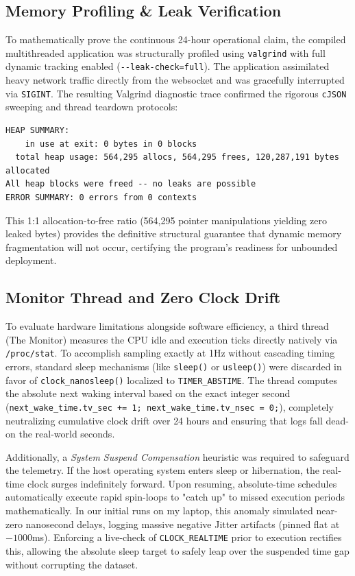 \documentclass[12pt,a4paper]{article}
\begin{document}
\subsection{Memory Profiling \& Leak Verification}
To mathematically prove the continuous 24-hour operational claim, the compiled multithreaded application was structurally profiled using \texttt{valgrind} with full dynamic tracking enabled (\texttt{-{}-leak-check=full}).
The application assimilated heavy network traffic directly from the websocket and was gracefully interrupted via \texttt{SIGINT}. The resulting Valgrind diagnostic trace confirmed the rigorous \texttt{cJSON} sweeping and thread teardown protocols:
\begin{verbatim}
HEAP SUMMARY:
    in use at exit: 0 bytes in 0 blocks
  total heap usage: 564,295 allocs, 564,295 frees, 120,287,191 bytes allocated
All heap blocks were freed -- no leaks are possible
ERROR SUMMARY: 0 errors from 0 contexts
\end{verbatim}
This 1:1 allocation-to-free ratio (564,295 pointer manipulations yielding zero leaked bytes) provides the definitive structural guarantee that dynamic memory fragmentation will not occur, certifying the program's readiness for unbounded deployment.

\subsection{Monitor Thread and Zero Clock Drift}
To evaluate hardware limitations alongside software efficiency, a third thread (The Monitor) measures the CPU idle and execution ticks directly natively via \texttt{/proc/stat}. 
To accomplish sampling exactly at 1Hz without cascading timing errors, standard sleep mechanisms (like \texttt{sleep()} or \texttt{usleep()}) were discarded in favor of \texttt{clock\_nanosleep()} localized to \texttt{TIMER\_ABSTIME}. The thread computes the absolute next waking interval based on the exact integer second (\texttt{next\_wake\_time.tv\_sec += 1; next\_wake\_time.tv\_nsec = 0;}), completely neutralizing cumulative clock drift over 24 hours and ensuring that logs fall dead-on the real-world seconds.

Additionally, a \textit{System Suspend Compensation} heuristic was required to safeguard the telemetry. If the host operating system enters sleep or hibernation, the real-time clock surges indefinitely forward. Upon resuming, absolute-time schedules automatically execute rapid spin-loops to "catch up" to missed execution periods mathematically. In our initial runs on my laptop, this anomaly simulated near-zero nanosecond delays, logging massive negative Jitter artifacts (pinned flat at $-1000$ms). Enforcing a live-check of \texttt{CLOCK\_REALTIME} prior to execution rectifies this, allowing the absolute sleep target to safely leap over the suspended time gap without corrupting the dataset.
\end{document}
